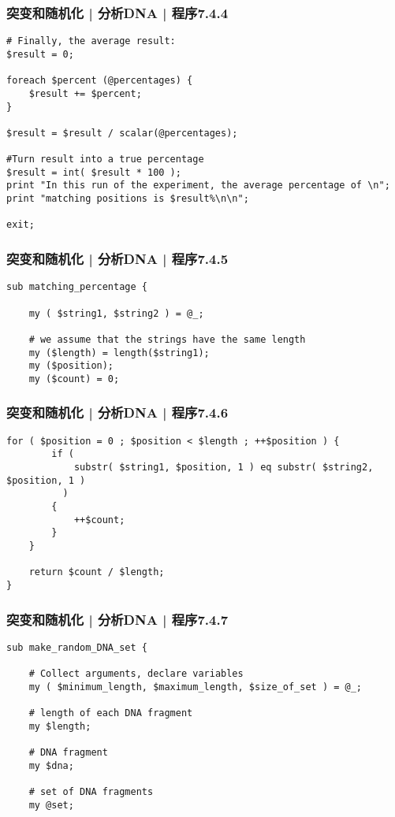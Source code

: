 \begin{frame}[fragile]
  \frametitle{突变和随机化 | 分析DNA | 程序7.4.4}
  \vspace{-1.5em}
\begin{lstlisting}[firstnumber=33]
# Finally, the average result:
$result = 0;

foreach $percent (@percentages) {
    $result += $percent;
}

$result = $result / scalar(@percentages);

#Turn result into a true percentage
$result = int( $result * 100 );
print "In this run of the experiment, the average percentage of \n";
print "matching positions is $result%\n\n";

exit;
\end{lstlisting}
\end{frame}

\begin{frame}[fragile]
  \frametitle{突变和随机化 | 分析DNA | 程序7.4.5}
  \vspace{-1.5em}
\begin{lstlisting}[firstnumber=58]
sub matching_percentage {

    my ( $string1, $string2 ) = @_;

    # we assume that the strings have the same length
    my ($length) = length($string1);
    my ($position);
    my ($count) = 0;
\end{lstlisting}
\end{frame}

\begin{frame}[fragile]
  \frametitle{突变和随机化 | 分析DNA | 程序7.4.6}
  \vspace{-1.5em}
\begin{lstlisting}[firstnumber=67]
    for ( $position = 0 ; $position < $length ; ++$position ) {
        if (
            substr( $string1, $position, 1 ) eq substr( $string2, $position, 1 )
          )
        {
            ++$count;
        }
    }

    return $count / $length;
}
\end{lstlisting}
\end{frame}

\begin{frame}[fragile]
  \frametitle{突变和随机化 | 分析DNA | 程序7.4.7}
  \vspace{-1.5em}
\begin{lstlisting}[firstnumber=89]
sub make_random_DNA_set {

    # Collect arguments, declare variables
    my ( $minimum_length, $maximum_length, $size_of_set ) = @_;

    # length of each DNA fragment
    my $length;

    # DNA fragment
    my $dna;

    # set of DNA fragments
    my @set;
\end{lstlisting}
\end{frame}

